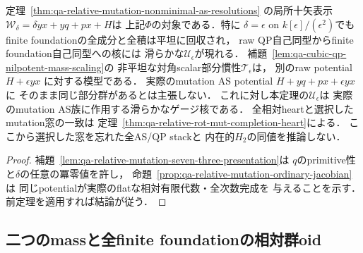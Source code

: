 \begin{corollary}
\label{cor:qa-mass-gauge-actual-as-window}
定理~\ref{thm:qa-relative-mutation-nonminimal-as-resolutions}
の局所十矢表示
$\mathcal W_\delta=\delta yx+yq+px+H$は
上記$\Phi$の対象である．特に
$\delta=\epsilon$ on $k[\epsilon]/(\epsilon^2)$でも
finite foundationの全成分と全積は平坦に回収され，
raw QP自己同型からfinite foundation自己同型への核には
滑らかな$\mathcal U_\epsilon$が現れる．
補題~\ref{lem:qa-cubic-qp-nilpotent-mass-scaling}の
非平坦な対角scalar部分慣性$\mathcal T_\epsilon$は，
別のraw potential $H+\epsilon yx$ に対する模型である．
実際のmutation AS potential $H+yq+px+\epsilon yx$ に
そのまま同じ部分群があるとは主張しない．
これに対し本定理の$\mathcal U_\epsilon$は
実際のmutation AS族に作用する滑らかなゲージ核である．
全相対heartと選択したmutation窓の一致は
定理~\ref{thm:qa-relative-rot-mut-completion-heart}による．
ここから選択した窓を忘れた全AS/QP stackと
内在的$H_2$の同値を推論しない．
\end{corollary}
\begin{proof}
補題~\ref{lem:qa-relative-mutation-seven-three-presentation}は
$q$のprimitive性と$\delta$の任意の冪零値を許し，
命題~\ref{prop:qa-relative-mutation-ordinary-jacobian}は
同じpotentialが実際のflatな相対有限代数・全次数完成を
与えることを示す．前定理を適用すれば結論が従う．
\end{proof}


\subsection{二つのmassと全finite foundationの相対群oid}
\label{subsec:qa-two-mass-finite-gerbe}

